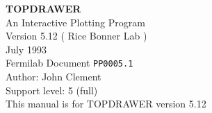 %
%
\addtolength{\textheight}{3cm}


\pagestyle{empty}
   \rule{0in}{3in}
   \begin{center}
   {\huge\bf TOPDRAWER}\\
   \vspace{3ex}
   {\Large An Interactive Plotting Program}\\
   \vspace{4ex}
   \large
   Version 5.12 ( Rice Bonner Lab )\\
   July 1993\\
   \vspace{5ex}
   Fermilab Document {\tt PP0005.1}\\
   Author: John Clement\\
   Support level: 5 (full)\\

   \vfill
   {\small This manual is for TOPDRAWER version 5.12\\
   }

   \end{center}
\newpage

\tableofcontents
\newpage

\setcounter{page}{1}
\pagestyle{myheadings}
